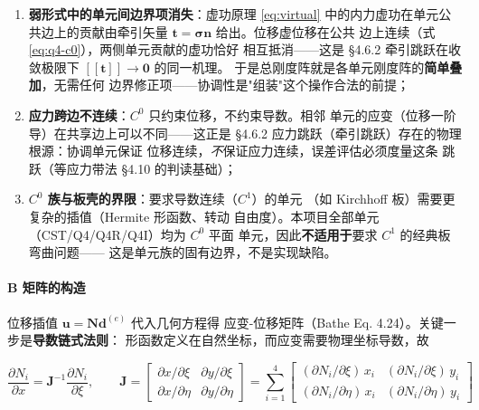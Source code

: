 \documentclass[12pt,a4paper]{ctexart}
\newcommand{\llbracket}{[\![}
\newcommand{\rrbracket}{]\!]}
\begin{document}
\begin{enumerate}[leftmargin=*]
  \item \textbf{弱形式中的单元间边界项消失}：虚功原理 \eqref{eq:virtual}
        中的内力虚功在单元公共边上的贡献由牵引矢量
        $\mathbf{t}=\boldsymbol{\sigma}\mathbf{n}$ 给出。位移虚位移在公共
        边上连续（式 \eqref{eq:q4-c0}），两侧单元贡献的虚功恰好
        相互抵消——这是 §4.6.2 牵引跳跃在收敛极限下
        $\llbracket\mathbf{t}\rrbracket \to \mathbf{0}$ 的同一机理。
        于是总刚度阵就是各单元刚度阵的\textbf{简单叠加}，无需任何
        边界修正项——协调性是"组装"这个操作合法的前提；
  \item \textbf{应力跨边不连续}：$C^0$ 只约束位移，不约束导数。相邻
        单元的应变（位移一阶导）在共享边上可以不同——这正是
        §4.6.2 应力跳跃（牵引跳跃）存在的物理根源：协调单元保证
        位移连续，\emph{不}保证应力连续，误差评估必须度量这条
        跳跃（等应力带法 §4.10 的判读基础）；
  \item \textbf{$C^0$ 族与板壳的界限}：要求导数连续（$C^1$）的单元
        （如 Kirchhoff 板）需要更复杂的插值（Hermite 形函数、转动
        自由度）。本项目全部单元（CST/Q4/Q4R/Q4I）均为 $C^0$ 平面
        单元，因此\textbf{不适用于}要求 $C^1$ 的经典板弯曲问题——
        这是单元族的固有边界，不是实现缺陷。
\end{enumerate}

\paragraph{B 矩阵的构造}

位移插值 $\mathbf{u} = \mathbf{N}\mathbf{d}^{(e)}$ 代入几何方程得
应变-位移矩阵（Bathe Eq. 4.24）。关键一步是\textbf{导数链式法则}：
形函数定义在自然坐标，而应变需要物理坐标导数，故

\begin{equation}
\frac{\partial N_i}{\partial x} = \mathbf{J}^{-1} \frac{\partial N_i}{\partial \xi},
\qquad
\mathbf{J} = \begin{bmatrix}
\partial x/\partial \xi & \partial y/\partial \xi \\
\partial x/\partial \eta & \partial y/\partial \eta
\end{bmatrix}
= \sum_{i=1}^{4} \begin{bmatrix}
(\partial N_i/\partial \xi)\, x_i & (\partial N_i/\partial \xi)\, y_i \\
(\partial N_i/\partial \eta)\, x_i & (\partial N_i/\partial \eta)\, y_i
\end{bmatrix}
\end{equation}
\end{document}
